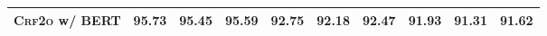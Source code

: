 \begin{table*}[tb]
\begin{tabularx}{\textwidth}{lccccccccc}
    \textsc{Crf2o} w/ BERT                           & 95.73                    & 95.45                      & 95.59                    & \textbf{92.75}           & \textbf{92.18}           & \textbf{92.47}           & \textbf{91.93} & 91.31          & \textbf{91.62} \\
    \bottomrule
  \end{tabularx}
  \label{table:con-test}
\end{table*}

